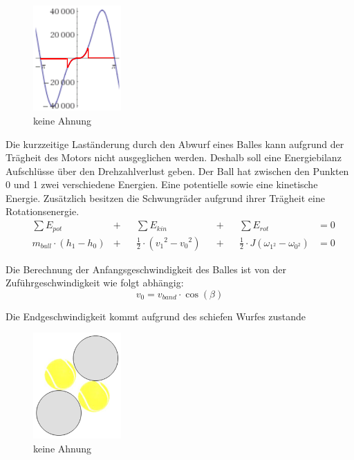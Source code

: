 \begin{figure}[h!]
\centering	\includegraphics[width=0.3\textwidth]{Enddokumentation/Anhang/Bilder/WeissNicht.png}
	\caption{keine Ahnung}
	\label{fig:keineAhnung}
\end{figure}Die kurzzeitige Laständerung durch den Abwurf eines Balles kann aufgrund der Trägheit des Motors nicht ausgeglichen werden. Deshalb soll eine Energiebilanz Aufschlüsse über den Drehzahlverlust geben. Der Ball hat zwischen den Punkten 0 und 1 zwei verschiedene Energien. Eine potentielle sowie eine kinetische Energie. Zusätzlich besitzen die Schwungräder aufgrund ihrer Trägheit eine Rotationsenergie.
\begin{align}
 &\sum E_{pot} &+&& \sum E_{kin} &&+&& \sum E_{rot} &= 0 \\
 & m_{ball} \cdot \left(h_1 - h_0\right) &+&&\frac{1}{2} \cdot \left( v_1{^{2}} - v_0{^{2}} \right) &&+&&\frac{1}{2} \cdot J \left( \omega_{1^{2}} - \omega_{0^{2}} \right) &= 0
\end{align}

Die Berechnung der Anfangsgeschwindigkeit des Balles ist von der Zuführgeschwindigkeit wie folgt abhängig:
\begin{equation}
 v_0 = v_{band} \cdot \cos(\beta)
\end{equation}

Die Endgeschwindigkeit kommt aufgrund des schiefen Wurfes zustande
\begin{figure}[h!]
	\centering
	\includegraphics[width=0.3\textwidth]{Enddokumentation/Anhang/Bilder/Ballnachfuehrung.png}
	\caption{keine Ahnung}
	\label{fig:Ballnachführung}
\end{figure}

